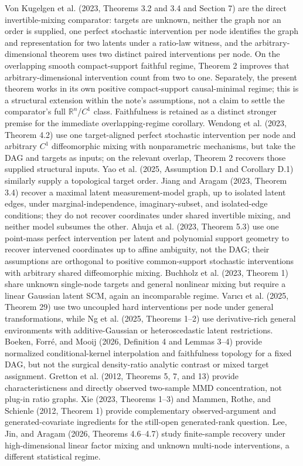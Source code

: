 \documentclass{article}
\begin{document}
Von Kugelgen et al. (2023, Theorems 3.2 and 3.4 and Section 7) are the direct invertible-mixing comparator: targets are unknown, neither the graph nor an order is supplied, one perfect stochastic intervention per node identifies the graph and representation for two latents under a ratio-law witness, and the arbitrary-dimensional theorem uses two distinct paired interventions per node. On the overlapping smooth compact-support faithful regime, Theorem 2 improves that arbitrary-dimensional intervention count from two to one. Separately, the present theorem works in its own positive compact-support causal-minimal regime; this is a structural extension within the note's assumptions, not a claim to settle the comparator's full \(\mathbb R^n\)/\(C^1\) class. Faithfulness is retained as a distinct stronger premise for the immediate overlapping-regime corollary. Wendong et al. (2023, Theorem 4.2) use one target-aligned perfect stochastic intervention per node and arbitrary \(C^1\) diffeomorphic mixing with nonparametric mechanisms, but take the DAG and targets as inputs; on the relevant overlap, Theorem 2 recovers those supplied structural inputs. Yao et al. (2025, Assumption D.1 and Corollary D.1) similarly supply a topological target order. Jiang and Aragam (2023, Theorem 3.4) recover a maximal latent measurement-model graph, up to isolated latent edges, under marginal-independence, imaginary-subset, and isolated-edge conditions; they do not recover coordinates under shared invertible mixing, and neither model subsumes the other. Ahuja et al. (2023, Theorem 5.3) use one point-mass perfect intervention per latent and polynomial support geometry to recover intervened coordinates up to affine ambiguity, not the DAG; their assumptions are orthogonal to positive common-support stochastic interventions with arbitrary shared diffeomorphic mixing. Buchholz et al. (2023, Theorem 1) share unknown single-node targets and general nonlinear mixing but require a linear Gaussian latent SCM, again an incomparable regime. Var\i{}c\i{} et al. (2025, Theorem 29) use two uncoupled hard interventions per node under general transformations, while Ng et al. (2025, Theorems 1--2) use derivative-rich general environments with additive-Gaussian or heteroscedastic latent restrictions. Boeken, Forr\'e, and Mooij (2026, Definition 4 and Lemmas 3--4) provide normalized conditional-kernel interpolation and faithfulness topology for a fixed DAG, but not the surgical density-ratio analytic contrast or mixed target assignment. Gretton et al. (2012, Theorems 5, 7, and 13) provide characteristicness and directly observed two-sample MMD concentration, not plug-in ratio graphs. Xie (2023, Theorems 1--3) and Mammen, Rothe, and Schienle (2012, Theorem 1) provide complementary observed-argument and generated-covariate ingredients for the still-open generated-rank question. Lee, Jin, and Aragam (2026, Theorems 4.6--4.7) study finite-sample recovery under high-dimensional linear factor mixing and unknown multi-node interventions, a different statistical regime.
\end{document}
